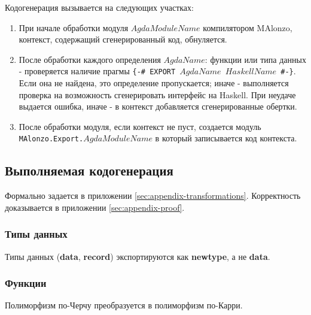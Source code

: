 Кодогенерация вызывается на следующих участках:
\begin{enumerate}
\item При начале обработки модуля \(AgdaModuleName\) компилятором MAlonzo,
      контекст, содержащий сгенерированный код, обнуляется.
\item После обработки каждого определения \(AgdaName\): функции или типа данных -
      проверяется наличие прагмы \texttt{\{-\# EXPORT \(AgdaName\) \(HaskellName\) \#-\}}.
      Если она не найдена, это определение пропускается; иначе - выполняется проверка
      на возможность сгенерировать интерфейс на Haskell. При неудаче выдается ошибка,
      иначе - в контекст добавляется сгенерированные обертки.
\item После обработки модуля, если контекст не пуст, создается модуль \texttt{MAlonzo.Export.\(AgdaModuleName\)}
      в который записывается код контекста.
\end{enumerate}

\subsection{Выполняемая кодогенерация}

Формально задается в приложении \ref{sec:appendix-transformations}.
Корректность доказывается в приложении \ref{sec:appendix-proof}.

\subsubsection{Типы данных}

Типы данных (\textbf{data}, \textbf{record}) экспортируются как \textbf{newtype},
а не \textbf{data}.

\subsubsection{Функции}

Полиморфизм по-Черчу преобразуется в полиморфизм по-Карри.
